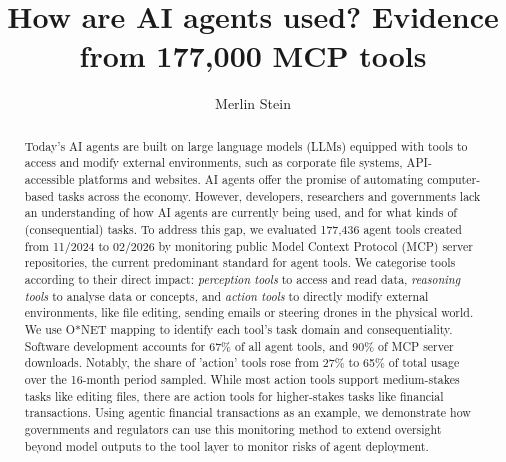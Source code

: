 \documentclass[manuscript,screen,nonacm,oneside]{acmart}
\begin{document}
\title[How are AI agents used? Evidence from 177,000 MCP ...]{How are AI agents used? Evidence from 177,000 MCP tools}

\author{Merlin Stein}

\renewcommand{\shortauthors}{Author}

\begin{abstract}
Today's AI agents are built on large language models (LLMs) equipped with tools to access and modify external environments, such as corporate file systems, API-accessible platforms and websites. AI agents offer the promise of automating computer-based tasks across the economy. However, developers, researchers and governments lack an understanding of how AI agents are currently being used, and for what kinds of (consequential) tasks. To address this gap, we evaluated 177,436 agent tools created from 11/2024 to 02/2026 by monitoring public Model Context Protocol (MCP) server repositories, the current predominant standard for agent tools. We categorise tools according to their direct impact: \emph{perception tools} to access and read data, \emph{reasoning tools} to analyse data or concepts, and \emph{action tools} to directly modify external environments, like file editing, sending emails or steering drones in the physical world. We use O*NET mapping to identify each tool's task domain and consequentiality. Software development accounts for 67\% of all agent tools, and 90\% of MCP server downloads. Notably, the share of 'action' tools rose from 27\% to 65\% of total usage over the 16-month period sampled. While most action tools support medium-stakes tasks like editing files, there are action tools for higher-stakes tasks like financial transactions. Using agentic financial transactions as an example, we demonstrate how governments and regulators can use this monitoring method to extend oversight beyond model outputs to the tool layer to monitor risks of agent deployment.
\end{abstract}

\end{document}
